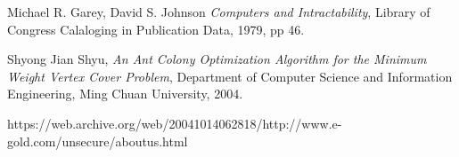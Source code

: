 \documentclass[oneside,12pt]{article}
\begin{document}
\begin{thebibliography}{99}	
  Michael R. Garey, David S. Johnson
  \emph{Computers and Intractability},
  Library of Congress Calaloging in Publication Data,
  1979,
  pp 46. 
  
  Shyong Jian Shyu,
  \emph{An Ant Colony Optimization Algorithm for the Minimum Weight Vertex Cover Problem},
  Department of Computer Science and Information Engineering, Ming Chuan University,
  2004.
  
  https://web.archive.org/web/20041014062818/http://www.e-gold.com/unsecure/aboutus.html
  
\end{thebibliography}
\end{document}
